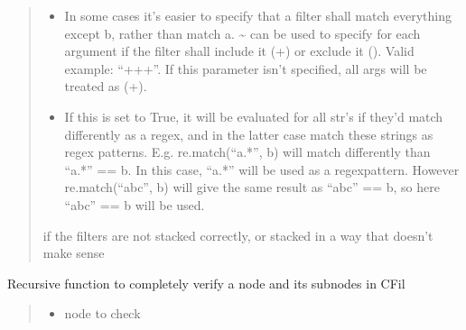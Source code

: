 \documentclass[a4paper,10pt,english]{sphinxmanual}
\begin{document}
\begin{fulllineitems}
\begin{fulllineitems}
\begin{quote}
\begin{description}
\begin{itemize}
\item {}
\sphinxAtStartPar
{} \textendash{} In some cases it’s easier to specify that a filter shall match everything except b, rather than
match a. \textasciitilde{} can be used to specify for each argument if the filter shall include it (+) or exclude it
(\sphinxhyphen{}). Valid example: “++\sphinxhyphen{}+”. If this parameter isn’t specified, all args will be treated as (+).

\item {}
\sphinxAtStartPar
{} \textendash{} If this is set to True, it will be evaluated for all str’s if they’d match differently as a
regex, and in the latter case match these strings as regex patterns. E.g. re.match(“a.*”, b) will match
differently than “a.*” == b. In this case, “a.*” will be used as a regex\sphinxhyphen{}pattern. However
re.match(“abc”, b) will give the same result as “abc” == b, so here “abc” == b will be used.

\end{itemize}

\sphinxAtStartPar
{} \textendash{} if the filters are not stacked correctly, or stacked in a way that doesn’t make sense

\end{description}\end{quote}

\end{fulllineitems}


\begin{fulllineitems}
\label{\detokenize{fagus:fagus.CFil.match_node}}
\pysigstartsignatures
{}
\pysigstopsignatures
\sphinxAtStartPar
Recursive function to completely verify a node and its subnodes in CFil
\begin{quote}\begin{description}
\begin{itemize}
\item {}
\sphinxAtStartPar
{} \textendash{} node to check


\end{itemize}
\end{description}
\end{quote}
\end{fulllineitems}
\end{fulllineitems}
\end{document}
